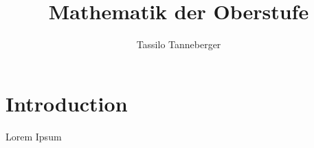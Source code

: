 \documentclass[a4paper,twoside]{scrbook}
\begin{document}
\title{Mathematik der Oberstufe}

\author{Tassilo Tanneberger}


\frontmatter
\maketitle
\tableofcontents
\mainmatter




\chapter{Introduction}
Lorem Ipsum
\end{document}
